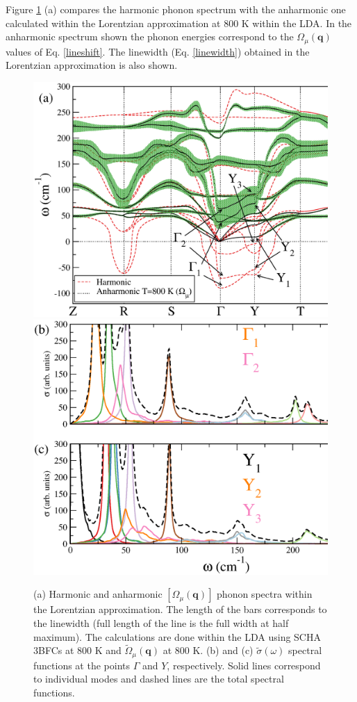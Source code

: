 Figure \ref{lw-sns} (a) compares the harmonic phonon spectrum with the anharmonic one calculated within the Lorentzian approximation at $800$ K within the LDA. In the anharmonic spectrum shown the phonon energies correspond to
the $\Omega_{\mu}(\mathbf{q})$ values of Eq. \ref{lineshift}. The linewidth (Eq. \ref{linewidth}) obtained in the Lorentzian approximation is also shown.
\begin{figure}[h]
\begin{center}
\includegraphics[width=0.7\linewidth]{Figures/phonon-sns.eps}
\includegraphics[width=0.7\linewidth]{Figures/spf-sns.eps}
\caption[Phonons within the Lorentzian approximation in SnS.]{(a) Harmonic and anharmonic $[\Omega_{\mu}(\mathbf{q})]$ phonon spectra within the Lorentzian approximation. The length of the bars corresponds to the linewidth (full 
length of the line is the full width at half maximum). The calculations are done within the LDA using SCHA 3BFCs at $800$ K and $\tilde{\Omega}_{\mu}(\mathbf{q})$ at $800$ K. (b) and (c) $\tilde{\sigma}(\omega)$ spectral functions at 
the points $\Gamma$ and $Y$, respectively. Solid lines correspond to individual modes and dashed lines are the total spectral functions.}
\label{lw-sns}
\end{center}
\end{figure}
